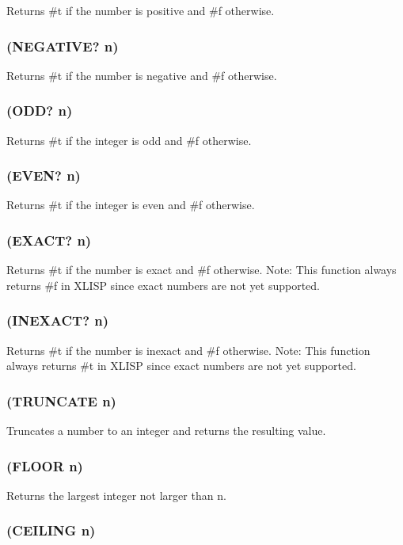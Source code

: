 \documentclass[11pt]{article}
\begin{document}
Returns \#t if the number is positive and \#f otherwise.
\subsubsection{(NEGATIVE? n)}
\label{sec-4-25-4}

Returns \#t if the number is negative and \#f otherwise.
\subsubsection{(ODD? n)}
\label{sec-4-25-5}

Returns \#t if the integer is odd and \#f otherwise.
\subsubsection{(EVEN? n)}
\label{sec-4-25-6}

Returns \#t if the integer is even and \#f otherwise.
\subsubsection{(EXACT? n)}
\label{sec-4-25-7}

Returns \#t if the number is exact and \#f otherwise.  Note: This
function always returns \#f in XLISP since exact numbers are not yet
supported.
\subsubsection{(INEXACT? n)}
\label{sec-4-25-8}

Returns \#t if the number is inexact and \#f otherwise.  Note: This
function always returns \#t in XLISP since exact numbers are not yet
supported.
\subsubsection{(TRUNCATE n)}
\label{sec-4-25-9}

Truncates a number to an integer and returns the resulting value.
\subsubsection{(FLOOR n)}
\label{sec-4-25-10}

Returns the largest integer not larger than n.
\subsubsection{(CEILING n)}
\label{sec-4-25-11}
\end{document}
